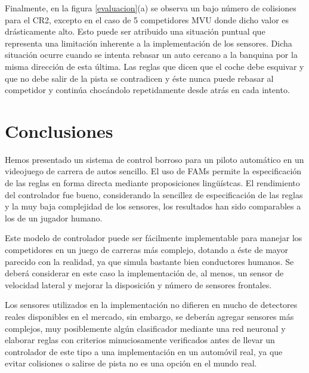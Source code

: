 \documentclass[conference,spanish,a4paper,10pt,oneside,final]{tfmpd}
\begin{document}
Finalmente, en la figura \ref{evaluacion}(a) se observa un bajo número de colisiones para el CR2,
excepto en el caso de 5 competidores MVU donde dicho valor es drásticamente alto.
Esto puede ser atribuido una situación puntual que representa una limitación inherente a la implementación de los sensores.
Dicha situación ocurre cuando se intenta rebasar un auto cercano a la banquina por la misma dirección de esta última.
Las reglas que dicen que el coche debe esquivar y que no debe salir de la pista se contradicen y éste nunca puede rebasar
al competidor y continúa chocándolo repetidamente desde atrás en cada intento.
%
%
%
%
\section{Conclusiones}
Hemos presentado un sistema de control borroso para un piloto automático en un videojuego
de carrera de autos sencillo. El uso de FAMs permite la especificación de las reglas
en forma directa mediante proposiciones lingüístcas. 
El rendimiento del controlador fue bueno, considerando la sencillez de especificación
de las reglas y la muy baja complejidad de los sensores, los resultados han sido comparables
a los de un jugador humano.

Este modelo de controlador puede ser fácilmente implementable para manejar los competidores
en un juego de carreras más complejo, dotando a éste de mayor parecido con la realidad, ya
que simula bastante bien conductores humanos. Se deberá considerar en este caso la implementación
de, al menos, un sensor de velocidad lateral y mejorar la disposición y número de sensores frontales.

Los sensores utilizados en la
implementación no difieren en mucho de detectores reales disponibles en el mercado,
sin embargo, se deberán agregar sensores más complejos, muy posiblemente algún clasificador
mediante una red neuronal y elaborar reglas con criterios
minuciosamente verificados antes de llevar un controlador de este tipo a una implementación
en un automóvil real, ya que evitar colisiones o salirse de pista no es una opción en el
mundo real.
%
%
%
%
\end{document}
